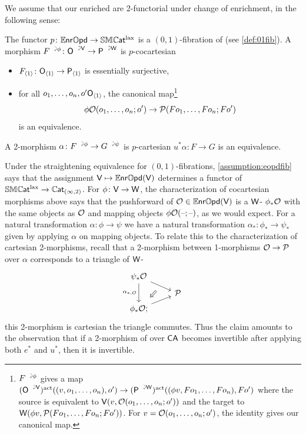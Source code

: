 \documentclass[a4paper,11pt]{article}
\begin{document}
We assume that our enriched \iopds{} are 2-functorial under change of
enrichment, in the following sense:
\begin{assumption}\label{assumption:eopdfib}
  The functor $p \colon \ENROPD \to \SMCATl$ is a $(0,1)$-fibration of
  \itcats{} (see \cref{def:01fib}). A morphism $\ract{F}{\phi} \colon \uract{O}{V} \to
  \uract{P}{W}$ is $p$-cocartesian \IFF{}
  \begin{itemize}
  \item $F_{\angled{1}} \colon \oO_{\angled{1}} \to \oP_{\angled{1}}$ is essentially surjective,
  \item for all $o_{1},\dots,o_{n},o' \textup{\textsf{O}}_{\langle 1 \rangle}$, the canonical
    map\footnote{$\ract{F}{\phi}$ gives a map 
      $ (\uract{O}{V})^{\act}((v, o_{1},\dots,o_{n}), o') \to
        (\uract{P}{W})^{\act}((\phi v, F o_{1},\dots, F o_{n}), F o')
      $
      where the source is equivalent to
      $\textup{\textsf{V}}(v, \mathcal{O}(o_{1},\dots,o_{n};o'))$ and the target to
      $\textup{\textsf{W}}(\phi v, \mathcal{P}(F o_{1},\dots,F o_{n}; F o'))$. For
      $v = \mathcal{O}(o_{1},\dots,o_{n};o')$, the identity gives our
      canonical map.}
    \[ \phi \eO(o_{1},\dots,o_{n};o')  \to \eP(F o_{1},\dots,F o_{n}; F
      o')\]
    is an equivalence.
  \end{itemize}
  A 2-morphism $\alpha \colon \ract{F}{\phi} \to \ract{G}{\psi}$ is
  $p$-cartesian \IFF{} $u^{*}\alpha \colon F \to G$ is an equivalence.
\end{assumption}

\begin{remark}
  Under the straightening equivalence for $(0,1)$-fibrations,
  \cref{assumption:eopdfib} says that the assignment $\textup{\textsf{V}}
  \mapsto \mathbb{E}\mkern-0.5mu\textsf{\textup{nr}}\mathbb{O}\mkern-0.5mu\textsf{\textup{pd}}(\textup{\textsf{V}})$ determines a functor of \itcats{} $\SMCATl \to
  \CATIT$. For $\phi \colon \oV \to \oW$, the characterization of
  cocartesian morphisms above says that the pushforward of $\mathcal{O} \in
  \mathbb{E}\mkern-0.5mu\textsf{\textup{nr}}\mathbb{O}\mkern-0.5mu\textsf{\textup{pd}}(\textup{\textsf{V}})$ is a $\textup{\textsf{W}}$-\iopd{} $\phi_{*}\mathcal{O}$ with the same objects
  as $\mathcal{O}$ and mapping objects $\phi \mathcal{O}(\text{\textendash};\text{\textendash})$, as we would
  expect. For a natural transformation $\alpha \colon \phi \to \psi$
  we have a natural transformation $\alpha_{*} \colon \phi_{*} \to \psi_{*}$ given by
  applying $\alpha$ on mapping objects. To relate this to the
  characterization of cartesian 2-morphisms, recall that a 2-morphism
  between 1-morphisms $\eO \to \eP$ over $\alpha$ corresponds to a triangle of $\textup{\textsf{W}}$-\iopds{}
  \[
    \begin{tikzcd}[row sep=tiny]
      \psi_{*}\eO \ar[dr, ""{name=A}'] \ar[dd, "\alpha_{*,\eO}"'] \\
      & \eP \\
      \phi_{*}\eO; \ar[ur]
      \ar[from=A,to=3-1,Rightarrow,shorten <= 8pt, shorten >= 8pt
      ]
    \end{tikzcd}
  \]
  this 2-morphism is cartesian \IFF{} the triangle commutes. Thus the
  claim amounts to the observation that if a 2-morphism of \iopds{}
  over $\textup{\textsf{CA}}$ becomes invertible after applying both $e^{*}$ and
  $u^{*}$, then it is invertible.
\end{remark}
\end{document}
